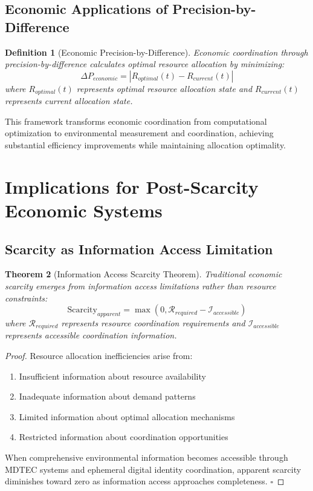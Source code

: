 \documentclass[12pt,a4paper]{article}
\newtheorem{theorem}{Theorem}
\newtheorem{definition}[theorem]{Definition}
\begin{document}
\subsection{Economic Applications of Precision-by-Difference}

\begin{definition}[Economic Precision-by-Difference]
Economic coordination through precision-by-difference calculates optimal resource allocation by minimizing:
\begin{equation}
\Delta P_{economic} = |R_{optimal}(t) - R_{current}(t)|
\end{equation}
where $R_{optimal}(t)$ represents optimal resource allocation state and $R_{current}(t)$ represents current allocation state.
\end{definition}

This framework transforms economic coordination from computational optimization to environmental measurement and coordination, achieving substantial efficiency improvements while maintaining allocation optimality.

\section{Implications for Post-Scarcity Economic Systems}

\subsection{Scarcity as Information Access Limitation}

\begin{theorem}[Information Access Scarcity Theorem]
Traditional economic scarcity emerges from information access limitations rather than resource constraints:
\begin{equation}
\text{Scarcity}_{apparent} = \max\left(0, \mathcal{R}_{required} - \mathcal{I}_{accessible}\right)
\end{equation}
where $\mathcal{R}_{required}$ represents resource coordination requirements and $\mathcal{I}_{accessible}$ represents accessible coordination information.
\end{theorem}

\begin{proof}
Resource allocation inefficiencies arise from:
\begin{enumerate}
\item Insufficient information about resource availability
\item Inadequate information about demand patterns  
\item Limited information about optimal allocation mechanisms
\item Restricted information about coordination opportunities
\end{enumerate}

When comprehensive environmental information becomes accessible through MDTEC systems and ephemeral digital identity coordination, apparent scarcity diminishes toward zero as information access approaches completeness. $\square$
\end{proof}
\end{document}

